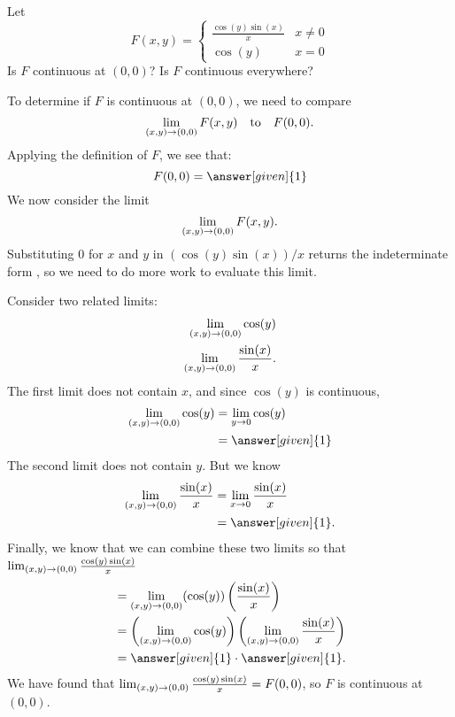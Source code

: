 \documentclass{ximera}
\begin{document}
\begin{example}
  Let
  \[
  F(x,y) = \begin{cases}
    \frac{\cos(y)\sin(x)}{x} & x\neq 0 \\
    \cos(y) & x=0
  \end{cases}
  \]
  Is $F$ continuous at $(0,0)$? Is $F$ continuous everywhere?
  \begin{explanation}
    To determine if $F$ is continuous at $(0,0)$, we need to compare
    \[
    \lim_{\left(x,y\right)\to\left(0,0\right)} F(x,y)\quad\text{to}\quad F(0,0).
    \]
    Applying the definition of $F$, we see that:
    \[
    F(0,0) = \answer[given]{1}
    \]
    We now consider the limit
    \[
    \lim_{\left(x,y\right)\to\left(0,0\right)}F(x,y).
    \]
    Substituting $0$ for $x$ and $y$ in $(\cos(y)\sin(x))/x$ returns the
    indeterminate form \zeroOverZero, so we need to do more work to
    evaluate this limit.
    
    Consider two related limits:
    \begin{align*}
      \lim_{\left(x,y\right)\to\left(0,0\right)} \cos(y)\\
      \lim_{\left(x,y\right)\to\left(0,0\right)} \frac{\sin(x)}{x}.
    \end{align*}
    The first limit does not contain $x$, and since $\cos(y)$ is
    continuous,
    \begin{align*}
    \lim_{\point{x,y}\to\point{0,0}} \cos(y) &=\lim_{y\to 0} \cos(y) \\
    &=\answer[given]{1}
    \end{align*}
    The second limit does not contain $y$. But we know
    \begin{align*}
      \lim_{\point{x,y}\to\point{0,0}} \frac{\sin(x)}{x} &= \lim_{x\to 0} \frac{\sin(x)}{x} \\
      &= \answer[given]{1}.
    \end{align*}
    Finally, we know that we can combine these two limits so that 
    $\lim_{\left(x,y\right)\to\left(0,0\right)} \frac{\cos(y)\sin(x)}{x}$
    \begin{align*}
      &= \lim_{\point{x,y}\to\point{0,0}} (\cos(y))\left(\frac{\sin(x)}{x}\right) \\ 
      &=\left(\lim_{\point{x,y}\to\point{0,0}} \cos(y)\right)\left(\lim_{\point{x,y}\to\point{0,0}} \frac{\sin(x)}{x}\right) \\
            &=\answer[given]{1}\cdot \answer[given]{1}.
    \end{align*}
    We have found that $\lim_{\left(x,y\right)\to\left(0,0\right)} \frac{\cos(y)\sin(x)}{x} =
    F(0,0)$, so $F$ is continuous at $(0,0)$.


\end{explanation}
\end{example}
\end{document}
